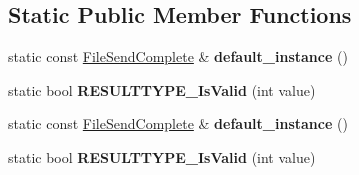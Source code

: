 \subsection*{Static Public Member Functions}
\begin{DoxyCompactItemize}
\item 
\mbox{\label{classruntime_1_1FileSendComplete_add8fc4af6cba6e6897d40ab74bb79d49}} 
static const \hyperlink{classruntime_1_1FileSendComplete}{File\+Send\+Complete} \& {\bfseries default\+\_\+instance} ()
\item 
\mbox{\label{classruntime_1_1FileSendComplete_a956b3e2163c4de294d8cf47f007113db}} 
static bool {\bfseries R\+E\+S\+U\+L\+T\+T\+Y\+P\+E\+\_\+\+Is\+Valid} (int value)
\item 
\mbox{\label{classruntime_1_1FileSendComplete_a88633217911adc94158dbb687f05f385}} 
static const \hyperlink{classruntime_1_1FileSendComplete}{File\+Send\+Complete} \& {\bfseries default\+\_\+instance} ()
\item 
\mbox{\label{classruntime_1_1FileSendComplete_a956b3e2163c4de294d8cf47f007113db}} 
static bool {\bfseries R\+E\+S\+U\+L\+T\+T\+Y\+P\+E\+\_\+\+Is\+Valid} (int value)
\end{DoxyCompactItemize}
